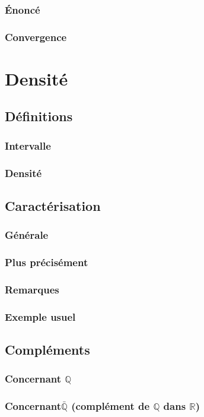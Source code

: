 \documentclass[12pt,a4paper,french]{book}
\begin{document}
			\subsubsection{Énoncé}
			\subsubsection{Convergence}
	\section{Densité}
		\subsection{Définitions}
			\subsubsection{Intervalle}
			\subsubsection{Densité}
		\subsection{Caractérisation}
			\subsubsection{Générale}
			\subsubsection{Plus précisément}
			\subsubsection{Remarques}
			\subsubsection{Exemple usuel}
		\subsection{Compléments}
			\subsubsection{Concernant $\mathbb{Q}$}
			\subsubsection{Concernant$\bar{\mathbb{Q}}$ (complément de $\mathbb{Q}$ dans $\mathbb{R}$)}
			
\end{document}
